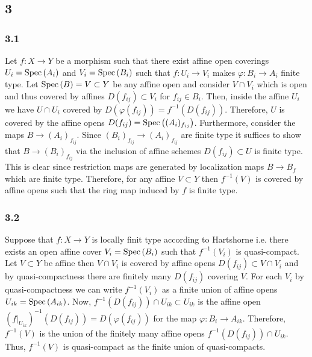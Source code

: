 \documentclass[12pt]{article}
\begin{document}
\renewcommand{\P}{\mathbb{P}}

\subsection{3}

\subsubsection{3.1}

Let $f : X \to Y$ be a morphism such that there exist affine open coverings $U_i = \mathrm{Spec}\left( A_i \right)$ and $V_i = \mathrm{Spec}\left( B_i \right)$ such that $f : U_i \to V_i$ makes $\varphi : B_i \to A_i$ finite type. Let $\mathrm{Spec}\left( B \right) = V \subset Y$ be any affine open and consider $V \cap V_i$ which is open and thus covered by affines $D(f_{ij}) \subset V_i$ for $f_{ij} \in B_i$. Then, inside the affine $U_i$ we have $U \cap U_i$ covered by $D(\varphi(f_{ij})) = f^{-1}(D(f_{ij}))$. Therefore, $U$ is covered by the affine opens $D(f_{ij}) = \mathrm{Spec}\left( (A_i)_{f_{ij}} \right)$. Furthermore, consider the maps $B \to (A_i)_{f_{ij}}$. Since $(B_i)_{f_{ij}} \to (A_i)_{f_{ij}}$ are finite type it suffices to show that $B \to (B_i)_{f_{ij}}$ via the inclusion of affine schemes $D(f_{ij}) \subset U$ is finite type. This is clear since restriction maps are generated by localization maps $B \to B_f$ which are finite type. Therefore, for any affine $V \subset Y$ then $f^{-1}(V)$ is covered by affine opens such that the ring map induced by $f$ is finite type. 

\subsubsection{3.2}

Suppose that $f : X \to Y$ is locally finit type according to Hartshorne i.e. there exists an open affine cover $V_i = \mathrm{Spec}\left( B_i \right)$ such that $f^{-1}(V_i)$ is quasi-compact. Let $V \subset Y$ be affine then $V \cap V_i$ is covered by affine opens $D(f_{ij}) \subset V \cap V_i$ and by quasi-compactness there are finitely many $D(f_{ij})$ covering $V$. For each $V_i$ by quasi-compactness we can write $f^{-1}(V_i)$ as a finite union of affine opens $U_{ik} = \mathrm{Spec}\left( A_{ik} \right)$. Now, $f^{-1}(D(f_{ij}) ) \cap U_{ik} \subset U_{ik}$ is the affine open $(f|_{U_{ik}})^{-1}(D(f_{ij})) = D(\varphi(f_{ij}))$ for the map $\varphi : B_i \to A_{ik}$. Therefore, $f^{-1}(V)$ is the union of the finitely many affine opens $f^{-1}(D(f_{ij})) \cap U_{ik}$. Thus, $f^{-1}(V)$ is quasi-compact as the finite union of quasi-compacts.
\end{document}
